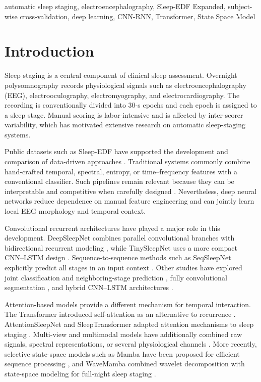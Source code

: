 \documentclass[conference]{IEEEtran}
\begin{document}
\begin{IEEEkeywords}
automatic sleep staging, electroencephalography, Sleep-EDF Expanded, subject-wise cross-validation, deep learning, CNN-RNN, Transformer, State Space Model
\end{IEEEkeywords}

\section{Introduction}

Sleep staging is a central component of clinical sleep assessment. Overnight polysomnography records physiological signals such as electroencephalography (EEG), electrooculography, electromyography, and electrocardiography. The recording is conventionally divided into 30-s epochs and each epoch is assigned to a sleep stage. Manual scoring is labor-intensive and is affected by inter-scorer variability, which has motivated extensive research on automatic sleep-staging systems.

Public datasets such as Sleep-EDF have supported the development and comparison of data-driven approaches \cite{sleepedfx_dataset,kemp2000analysis}. Traditional systems commonly combine hand-crafted temporal, spectral, entropy, or time--frequency features with a conventional classifier. Such pipelines remain relevant because they can be interpretable and competitive when carefully designed \cite{vandonckt2023traditional,lal2023temporal}. Nevertheless, deep neural networks reduce dependence on manual feature engineering and can jointly learn local EEG morphology and temporal context.

Convolutional recurrent architectures have played a major role in this development. DeepSleepNet combines parallel convolutional branches with bidirectional recurrent modeling \cite{supratak2017deepsleepnet}, while TinySleepNet uses a more compact CNN--LSTM design \cite{supratak2020tinysleepnet}. Sequence-to-sequence methods such as SeqSleepNet explicitly predict all stages in an input context \cite{phan2019seqsleepnet}. Other studies have explored joint classification and neighboring-stage prediction \cite{phan2018joint}, fully convolutional segmentation \cite{perslev2019utime}, and hybrid CNN--LSTM architectures \cite{li2023hybrid,toma2023multichannel}.

Attention-based models provide a different mechanism for temporal interaction. The Transformer introduced self-attention as an alternative to recurrence \cite{vaswani2017attention}. AttentionSleepNet and SleepTransformer adapted attention mechanisms to sleep staging \cite{eldele2021attention,phan2022sleeptransformer}. Multi-view and multimodal models have additionally combined raw signals, spectral representations, or several physiological channels \cite{phan2022xsleepnet,zheng2022mmasleepnet}. More recently, selective state-space models such as Mamba have been proposed for efficient sequence processing \cite{gu2023mamba}, and WaveMamba combined wavelet decomposition with state-space modeling for full-night sleep staging \cite{sano2025wavemamba}.
\end{document}
